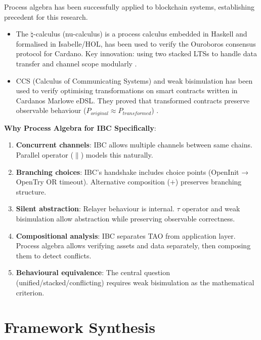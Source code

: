 Process algebra has been successfully applied to blockchain systems,
establishing precedent for this research.

\begin{itemize}
\item
  The \(\natural\)-calculus (nu-calculus) is a process calculus embedded
  in Haskell and formalised in Isabelle/HOL, has been used to verify the
  Ouroboros consensus protocol for Cardano. Key innovation: using two
  stacked LTSs to handle data transfer and channel scope modularly
  \citep{jeltsh2019}.
\item
  CCS (Calculus of Communicating Systems) and weak bisimulation has been
  used to verify optimising transformations on smart contracts written
  in Cardano\textquotesingle s Marlowe eDSL. They proved that
  transformed contracts preserve observable behaviour
  (\(P_{original} \approx P_{transformed}\)) \citep{mcilwaine2025}.
\end{itemize}

\textbf{Why Process Algebra for IBC Specifically}:

\begin{enumerate}
    \item \textbf{Concurrent channels}: IBC allows multiple channels between same chains. Parallel operator (\(\parallel\)) models this naturally.
    \item \textbf{Branching choices}: IBC's handshake includes choice points (OpenInit → OpenTry OR timeout). Alternative composition (\(+\)) preserves branching structure.
    \item \textbf{Silent abstraction}: Relayer behaviour is internal. \(\tau\) operator and weak bisimulation allow abstraction while preserving observable correctness.
    \item \textbf{Compositional analysis}: IBC separates TAO from application layer. Process algebra allows verifying assets and data separately, then composing them to detect conflicts.
    \item \textbf{Behavioural equivalence}: The central question (unified/stacked/conflicting) requires weak bisimulation as the mathematical criterion.
\end{enumerate}

\section{Framework Synthesis}\label{framework-synthesis}
